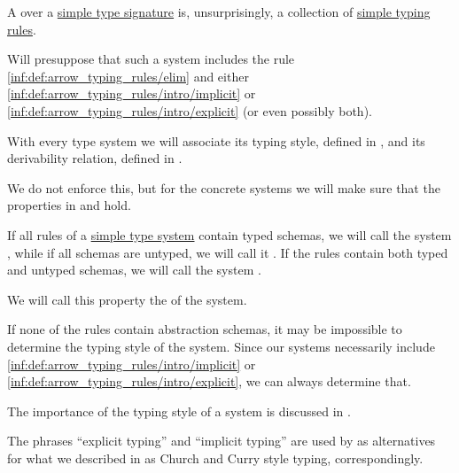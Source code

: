 \begin{definition}\label{def:simple_type_system}\mimprovised
  A  over a \hyperref[def:simple_type_signature]{simple type signature} is, unsurprisingly, a collection of \hyperref[def:simple_typing_rule]{simple typing rules}.

  Will presuppose that such a system includes the rule \ref{inf:def:arrow_typing_rules/elim} and either \ref{inf:def:arrow_typing_rules/intro/implicit} or \ref{inf:def:arrow_typing_rules/intro/explicit} (or even possibly both).
\end{definition}
\begin{comments}
  \item With every type system we will associate its typing style, defined in , and its derivability relation, defined in .

  \item We do not enforce this, but for the concrete systems we will make sure that the properties in  and  hold.
\end{comments}

\begin{definition}\label{def:simple_type_system_style}\mimprovised
  If all rules of a \hyperref[def:simple_type_system]{simple type system} contain typed schemas, we will call the system , while if all schemas are untyped, we will call it . If the rules contain both typed and untyped schemas, we will call the system .

  We will call this property the  of the system.
\end{definition}
\begin{comments}
  \item If none of the rules contain abstraction schemas, it may be impossible to determine the typing style of the system. Since our systems necessarily include \ref{inf:def:arrow_typing_rules/intro/implicit} or \ref{inf:def:arrow_typing_rules/intro/explicit}, we can always determine that.

  \item The importance of the typing style of a system is discussed in .

  \item The phrases \enquote{explicit typing} and \enquote{implicit typing} are used by  as alternatives for what we described in  as Church and Curry style typing, correspondingly.
\end{comments}

